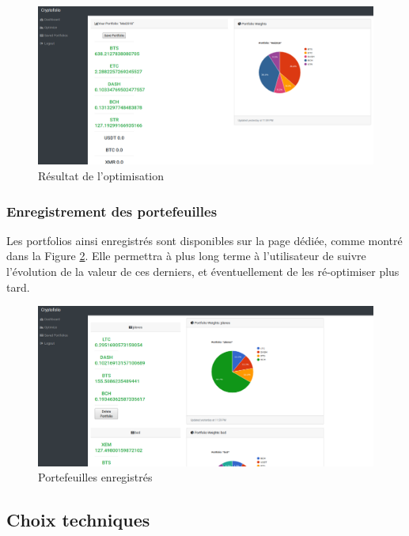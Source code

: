 \documentclass[a4paper, 10pt]{article}
\begin{document}
\begin{figure}[ht!]
\begin{center}
\includegraphics[width=1.0\textwidth]{images/Result.png}
\caption{Résultat de l'optimisation}
\label{fig:results}
\end{center}
\end{figure}

\subsubsection{Enregistrement des portefeuilles}
\label{sec:developpement_pages_save}

Les portfolios ainsi enregistrés sont disponibles sur la page dédiée, comme montré dans la Figure \ref{fig:saved}. Elle permettra à plus long terme à l'utilisateur de suivre l'évolution de la valeur de ces derniers, et éventuellement de les ré-optimiser plus tard.

\begin{figure}[ht!]
\begin{center}
\includegraphics[width=1.0\textwidth]{images/SavedPortfolios.png}
\caption{Portefeuilles enregistrés}
\label{fig:saved}
\end{center}
\end{figure}

\subsection{Choix techniques}
\label{sec:developpement_choix}
\end{document}
